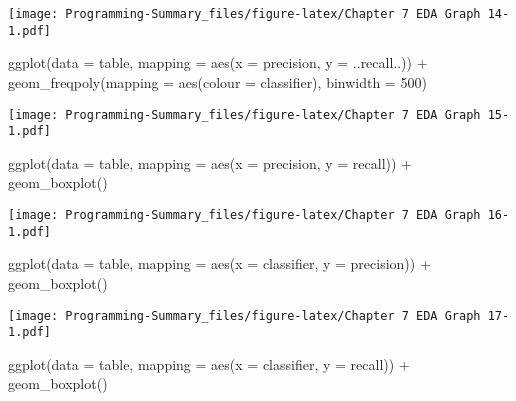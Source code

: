 \documentclass[
]{article}
\newenvironment{Shaded}{\begin{snugshade}}{\end{snugshade}}
\newcommand{\AttributeTok}[1]{\textcolor[rgb]{0.77,0.63,0.00}{#1}}
\newcommand{\DecValTok}[1]{\textcolor[rgb]{0.00,0.00,0.81}{#1}}
\newcommand{\FunctionTok}[1]{\textcolor[rgb]{0.00,0.00,0.00}{#1}}
\newcommand{\NormalTok}[1]{#1}
\newcommand{\SpecialCharTok}[1]{\textcolor[rgb]{0.00,0.00,0.00}{#1}}
\begin{document}
\texttt{[image: Programming-Summary\_files/figure-latex/Chapter 7 EDA Graph 14-1.pdf]}

\begin{Shaded}
\begin{Highlighting}[]
\FunctionTok{ggplot}\NormalTok{(}\AttributeTok{data =}\NormalTok{ table, }\AttributeTok{mapping =} \FunctionTok{aes}\NormalTok{(}\AttributeTok{x =}\NormalTok{ precision, }\AttributeTok{y =}\NormalTok{ ..recall..)) }\SpecialCharTok{+} 
  \FunctionTok{geom\_freqpoly}\NormalTok{(}\AttributeTok{mapping =} \FunctionTok{aes}\NormalTok{(}\AttributeTok{colour =}\NormalTok{ classifier), }\AttributeTok{binwidth =} \DecValTok{500}\NormalTok{)}
\end{Highlighting}
\end{Shaded}

\texttt{[image: Programming-Summary\_files/figure-latex/Chapter 7 EDA Graph 15-1.pdf]}

\begin{Shaded}
\begin{Highlighting}[]
\FunctionTok{ggplot}\NormalTok{(}\AttributeTok{data =}\NormalTok{ table, }\AttributeTok{mapping =} \FunctionTok{aes}\NormalTok{(}\AttributeTok{x =}\NormalTok{ precision, }\AttributeTok{y =}\NormalTok{ recall)) }\SpecialCharTok{+}
  \FunctionTok{geom\_boxplot}\NormalTok{()}
\end{Highlighting}
\end{Shaded}

\texttt{[image: Programming-Summary\_files/figure-latex/Chapter 7 EDA Graph 16-1.pdf]}

\begin{Shaded}
\begin{Highlighting}[]
\FunctionTok{ggplot}\NormalTok{(}\AttributeTok{data =}\NormalTok{ table, }\AttributeTok{mapping =} \FunctionTok{aes}\NormalTok{(}\AttributeTok{x =}\NormalTok{ classifier, }\AttributeTok{y =}\NormalTok{ precision)) }\SpecialCharTok{+}
  \FunctionTok{geom\_boxplot}\NormalTok{()}
\end{Highlighting}
\end{Shaded}

\texttt{[image: Programming-Summary\_files/figure-latex/Chapter 7 EDA Graph 17-1.pdf]}

\begin{Shaded}
\begin{Highlighting}[]
\FunctionTok{ggplot}\NormalTok{(}\AttributeTok{data =}\NormalTok{ table, }\AttributeTok{mapping =} \FunctionTok{aes}\NormalTok{(}\AttributeTok{x =}\NormalTok{ classifier, }\AttributeTok{y =}\NormalTok{ recall)) }\SpecialCharTok{+}
  \FunctionTok{geom\_boxplot}\NormalTok{()}
\end{Highlighting}
\end{Shaded}
\end{document}
